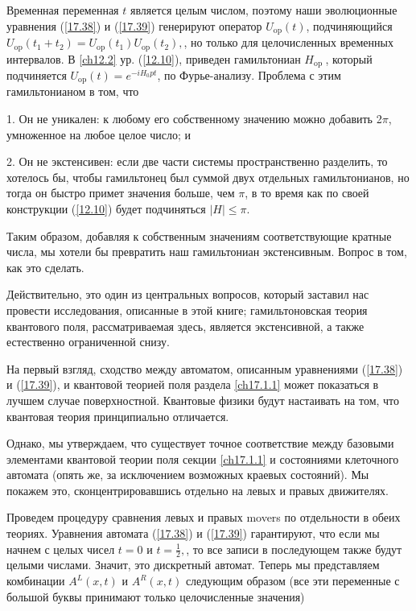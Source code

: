 \documentclass[main.tex]{subfiles}
\begin{document}
Временная переменная $t$ является целым числом, поэтому наши эволюционные уравнения (\ref{17.38}) и (\ref{17.39}) генерируют оператор $U_{\mathrm{op}}(t)$, подчиняющийся $U_{\mathrm{op}}\left(t_{1}+t_{2}\right)=U_{\mathrm{op}}\left(t_{1}\right) U_{\mathrm{op}}\left(t_{2}\right),$, но только для целочисленных временных интервалов. В \ref{ch12.2} ур. (\ref{12.10}), приведен гамильтониан $H_{\text {op }}$, который подчиняется $U_{\mathrm{op}}(t)=e^{-i H_{0} p t}$, по Фурье-анализу. Проблема с этим гамильтонианом в том, что

1. Он не уникален: к любому его собственному значению можно добавить 2$ \pi$, умноженное на любое целое число; и

2. Он не экстенсивен: если две части системы пространственно разделить, то хотелось бы, чтобы гамильтонец был суммой двух отдельных гамильтонианов, но тогда он быстро примет значения больше, чем $\pi$, в то время как по своей конструкции (\ref{12.10}) будет подчиняться $|H| \leq \pi$.

Таким образом, добавляя к собственным значениям соответствующие кратные числа, мы хотели бы превратить наш гамильтониан экстенсивным. Вопрос в том, как это сделать.

Действительно, это один из центральных вопросов, который заставил нас провести исследования, описанные в этой книге; гамильтоновская теория квантового поля, рассматриваемая здесь, является экстенсивной, а также естественно ограниченной снизу.

На первый взгляд, сходство между автоматом, описанным уравнениями (\ref{17.38}) и (\ref{17.39}), и квантовой теорией поля раздела \ref{ch17.1.1} может показаться в лучшем случае поверхностной. Квантовые физики будут настаивать на том, что квантовая теория принципиально отличается.

Однако, мы утверждаем, что существует точное соответствие между базовыми элементами квантовой теории поля секции \ref{ch17.1.1} и состояниями клеточного автомата (опять же, за исключением возможных краевых состояний). Мы покажем это, сконцентрировавшись отдельно на левых и правых движителях.

Проведем процедуру сравнения левых и правых movers по отдельности в обеих теориях. Уравнения автомата (\ref{17.38}) и (\ref{17.39}) гарантируют, что если мы начнем с целых чисел $t=0$ и $t=\frac{1}{2},$, то все записи в последующем также будут целыми числами. Значит, это дискретный автомат. Теперь мы представляем комбинации $A^{L}(x, t)$ и $A^{R}(x, t)$ следующим образом (все эти переменные с большой буквы принимают только целочисленные значения)
\end{document}
